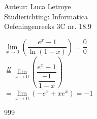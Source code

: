 \documentclass[a4paper]{article}
\begin{document}
  
\noindent \large Auteur: Luca Letroye        \\
\noindent \large Studierichting: Informatica \\
\noindent \large Oefeningenreeks 3C nr. 18.9 \\

\medskip

\normalsize

$ \lim\limits_{x \rightarrow 0} \left(\dfrac{e^x -1}{\ln (1-x)}\right) = \dfrac{0}{0}$\\

$ \overset{H}{=}  \lim\limits_{x \rightarrow 0} \left (\dfrac{e^x -1}{\dfrac{-1}{1-x}} \right)$\\

$ =  \lim\limits_{x \rightarrow 0} (-e^x +xe^x) = -1$\\


\begin{thebibliography}{999}
\end{thebibliography}
\end{document}

